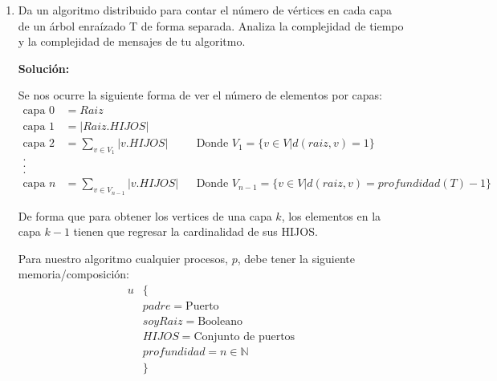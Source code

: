 \documentclass[8pt, letterpaper]{article}
\begin{document}
\begin{enumerate}
\begin{enumerate}
  \newpage
  \rmfamily
\item Extiende tu algoritmo para una gráfica arbitraria $G$.
  
  \hfill\break
  \ttfamily
  {\bf Solución:}

  \rule{1\textwidth}{0.2mm}
  {\bf Algoritmo 8} broadConvergecastGraphCuentaV(ID, soyRaiz):
  \hfill\break
  \rule{1\textwidth}{0.2mm}
  \hspace{0.2cm} {\bf Ejecutar inicialmente:}
  \hfill{}. buildSpanningTree(ID, root, <hola?>)
  \hfill\break
  \hspace{0.2cm}{\bf  Dado el árbol T obtenido en el paso uno:}
  \hfill{}. broadConvergecastTreeCuentaV(ID, soyRaiz) // Algoritmo 7 de esta tarea.
  \hfill\break
  \rule{1\textwidth}{0.2mm}

  \hfill\break
  \end{enumerate}
  \rmfamily
\item Da un algoritmo distribuido para contar el número de vértices en cada
  capa de un árbol enraízado T de forma separada. Analiza la complejidad
  de tiempo y la complejidad de mensajes de tu algoritmo.

  \hfill\break
  \ttfamily
  {\bf Solución:}

  Se nos ocurre la siguiente forma de ver el número de elementos por capas:
  \begin{align*}
    \text{capa } 0 &= Raiz\\
    \text{capa } 1 &= |Raiz.HIJOS|\\
    \text{capa } 2 &= \sum_{v\in V_1} |v.HIJOS| & &\text{Donde } V_1 =\{v\in V |
    d(raiz, v) = 1\}\\
    . \\
    . \\
    . \\
    \text{capa } n &=  \sum_{v\in V_{n-1}} |v.HIJOS| & &\text{Donde } V_{n-1} =
    \{v\in V | d(raiz, v) = profundidad(T)-1\}
  \end{align*}

  De forma que para obtener los vertices de una capa $k$, los elementos en la
  capa $k-1$ tienen que regresar la cardinalidad de sus HIJOS.

  Para nuestro algoritmo cualquier procesos, $p$, debe tener la siguiente
  memoria/composición:
  \begin{align*}
    u&\{ \\
    &padre = \text{Puerto}\\
    &soyRaiz = \text{Booleano}\\
    &HIJOS = \text{Conjunto de puertos} \\
    &profundidad = n \in \mathbb{N} \\
    &\}
  \end{align*}


\end{enumerate}
\end{document}
